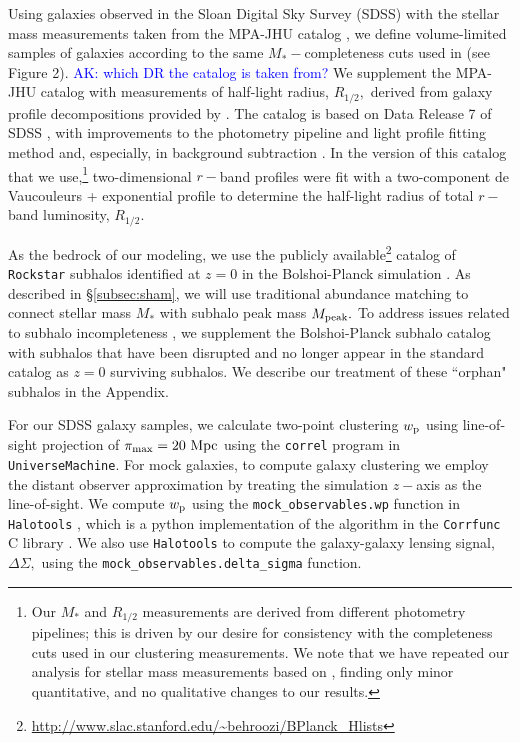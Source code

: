 \documentclass[usenatbib,usegraphicx,letterpaper]{mn2e}
\newcommand{\rhalf}{R_{1/2}}
\newcommand{\mstar}{M_{\ast}}
\newcommand{\mpeak}{M_{\rm peak}}
\newcommand{\wproj}{w_{\rm p}}
\newcommand{\mpc}{{\rm Mpc}}
\begin{document}
Using galaxies observed in the Sloan Digital Sky Survey (SDSS) with the stellar mass measurements taken from the MPA-JHU catalog \citep{kauffmann_etal03,brinchmann_etal04}, we define volume-limited samples of galaxies according to the same $\mstar-$completeness cuts used in \citet{behroozi_etal15} (see Figure 2). \textcolor{blue}{AK: which DR the catalog is taken from?} We supplement the MPA-JHU catalog with measurements of half-light radius, $\rhalf,$ derived from galaxy profile decompositions provided by \citet{meert_etal15}. The \citet{meert_etal15} catalog is based on Data Release 7 of SDSS \citep{abazajian_etal09}, with improvements to the photometry pipeline and light profile fitting method and, especially, in background subtraction \citep{vikram_etal10,bernardi_etal13,bernardi_etal14,meert_etal13}. In the version of this catalog that we use,\footnote{Our $\mstar$ and $\rhalf$ measurements are derived from different photometry pipelines; this is driven by our desire for consistency with the \citet{behroozi_etal15} completeness cuts used in our clustering measurements. We note that we have repeated our analysis for stellar mass measurements based on \citet{meert_etal15}, finding only minor quantitative, and no qualitative changes to our results.} two-dimensional $r-$band profiles were fit with a two-component de Vaucouleurs + exponential profile to determine the half-light radius of total $r-$band luminosity, $\rhalf.$

As the bedrock of our modeling, we use the publicly available\footnote{\url{http://www.slac.stanford.edu/~behroozi/BPlanck\_Hlists}} catalog of {\tt Rockstar} subhalos identified at $z=0$ in the Bolshoi-Planck simulation \citep{klypin_etal11,behroozi12_rockstar,behroozi12_consistent_trees,riebe_etal13,rodriguez_puebla16_bolplanck}. As described in \S\ref{subsec:sham}, we will use traditional abundance matching to connect stellar mass $\mstar$ with subhalo peak mass $\mpeak.$ To address issues related to subhalo incompleteness \citep{guo_white13,campbell_etal17}, we supplement the Bolshoi-Planck subhalo catalog with subhalos that have been disrupted and no longer appear in the standard catalog as $z=0$ surviving subhalos. We describe our treatment of these ``orphan" subhalos in the Appendix.

For our SDSS galaxy samples, we calculate two-point clustering $\wproj$ using line-of-sight projection of $\pi_{\rm max}=20~\mpc$ using the {\tt correl} program in {\tt UniverseMachine}. For mock galaxies, to compute galaxy clustering we employ the distant observer approximation by treating the simulation $z-$axis as the line-of-sight. We compute $\wproj$ using the {\tt mock\_observables.wp} function in {\tt Halotools} \citep{hearin_etal16}, which is a python implementation of the algorithm in the {\tt Corrfunc} C library \citep{sinha_etal17}. We also use {\tt Halotools} to compute the galaxy-galaxy lensing signal, $\Delta\Sigma,$ using the {\tt mock\_observables.delta\_sigma} function.
\end{document}
